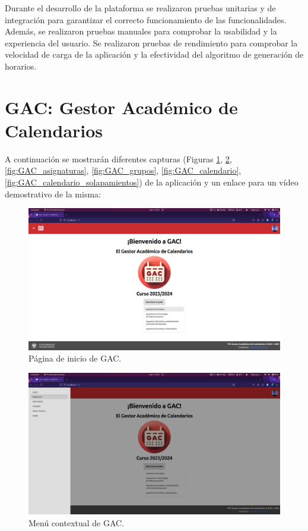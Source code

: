 Durante el desarrollo de la plataforma se realizaron pruebas unitarias y de integración para garantizar el correcto funcionamiento de las funcionalidades. Además, se realizaron pruebas manuales para comprobar la usabilidad y la experiencia del usuario. Se realizaron pruebas de rendimiento para comprobar la velocidad de carga de la aplicación y la efectividad del algoritmo de generación de horarios.\newline

\section{GAC: Gestor Académico de Calendarios}

A continuación se mostrarán diferentes capturas (Figuras \ref{fig:GAC_inicio}, \ref{fig:GAC_menu}, \ref{fig:GAC_asignaturas}, \ref{fig:GAC_grupos}, \ref{fig:GAC_calendario}, \ref{fig:GAC_calendario_solapamientos}) de la aplicación y un enlace para un vídeo demostrativo de la misma:

\begin{figure}[H]
    \centering
    \includegraphics[width=1\textwidth]{imagenes/GAC_inicio.png}
    \caption{Página de inicio de GAC.}
    \label{fig:GAC_inicio}
\end{figure}

\begin{figure}[H]
    \centering
    \includegraphics[width=1\textwidth]{imagenes/GAC_menu.png}
    \caption{Menú contextual de GAC.}
    \label{fig:GAC_menu}
\end{figure}

